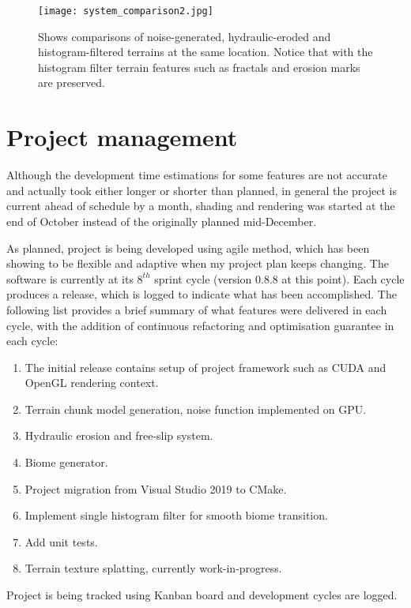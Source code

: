 \documentclass[oneside, a4paper]{article}
\begin{document}
    \begin{figure}[H]
        \texttt{[image: system\_comparison2.jpg]}
        \caption{Shows comparisons of noise-generated, hydraulic-eroded and histogram-filtered terrains at the same location. Notice that with the histogram filter terrain features such as fractals and erosion marks are preserved.}
    \end{figure}

    \section{Project management}
    Although the development time estimations for some features are not accurate and actually took either longer or shorter than planned, in general the project is current ahead of schedule by a month, shading and rendering was started at the end of October instead of the originally planned mid-December.

    As planned, project is being developed using agile method, which has been showing to be flexible and adaptive when my project plan keeps changing. The software is currently at its \(8^{th}\) sprint cycle (version 0.8.8 at this point). Each cycle produces a release, which is logged to indicate what has been accomplished. The following list provides a brief summary of what features were delivered in each cycle, with the addition of continuous refactoring and optimisation guarantee in each cycle:

    \begin{enumerate}[label=v0.\arabic*]
        \item The initial release contains setup of project framework such as CUDA and OpenGL rendering context.
        \item Terrain chunk model generation, noise function implemented on GPU.
        \item Hydraulic erosion and free-slip system.
        \item Biome generator.
        \item Project migration from Visual Studio 2019 to CMake.
        \item Implement single histogram filter for smooth biome transition.
        \item Add unit tests.
        \item Terrain texture splatting, currently work-in-progress.
    \end{enumerate}

    Project is being tracked using Kanban board and development cycles are logged.
    
\end{document}
